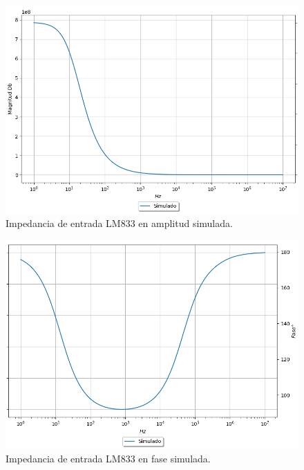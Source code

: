 \begin{figure}[H]	
	\centering
	\includegraphics[width=\textwidth]{Ejercicio2/Imagenes/Zin_A_LM833_Simulado.png}
	\caption{Impedancia de entrada LM833 en amplitud simulada.}
\end{figure}

\begin{figure}[H]	
	\centering
	\includegraphics[width=\textwidth]{Ejercicio2/Imagenes/Zin_F_LM833_Simulado.png}
	\caption{Impedancia de entrada LM833 en fase simulada.}
\end{figure}


